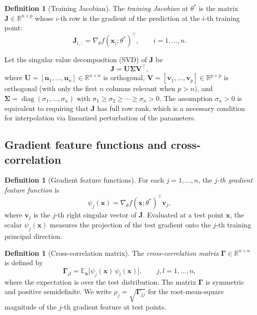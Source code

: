 \documentclass[12pt]{amsart}
\theoremstyle{definition}
\newtheorem{definition}[theorem]{Definition}
\theoremstyle{remark}
\DeclareMathOperator{\diag}{diag}
\newcommand{\R}{\mathbb{R}}
\newcommand{\E}{\mathbb{E}}
\newcommand{\bx}{\mathbf{x}}
\newcommand{\bJ}{\mathbf{J}}
\newcommand{\bU}{\mathbf{U}}
\newcommand{\bV}{\mathbf{V}}
\newcommand{\bu}{\mathbf{u}}
\newcommand{\bv}{\mathbf{v}}
\begin{document}
\begin{definition}[Training Jacobian]\label{def:jacobian}
The \emph{training Jacobian} at $\theta^{*}$ is the matrix
$\bJ \in \R^{n \times p}$ whose $i$-th row is the gradient of the prediction at
the $i$-th training point:
\begin{equation}\label{eq:jacobian}
  \bJ_{i,:} = \nabla_{\theta} f(\bx_{i}; \theta^{*})^{\top}, \qquad
  i = 1, \ldots, n.
\end{equation}
\end{definition}

Let the singular value decomposition (SVD) of $\bJ$ be
\begin{equation}\label{eq:svd}
  \bJ = \bU \boldsymbol{\Sigma} \bV^{\top},
\end{equation}
where $\bU = [\bu_{1}, \ldots, \bu_{n}] \in \R^{n \times n}$ is orthogonal,
$\bV = [\bv_{1}, \ldots, \bv_{p}] \in \R^{p \times p}$ is orthogonal (with
only the first $n$ columns relevant when $p > n$), and
$\boldsymbol{\Sigma} = \diag(\sigma_{1}, \ldots, \sigma_{n})$ with
$\sigma_{1} \geq \sigma_{2} \geq \cdots \geq \sigma_{n} > 0$.  The assumption
$\sigma_{n} > 0$ is equivalent to requiring that $\bJ$ has full row rank, which
is a necessary condition for interpolation via linearized perturbation of the
parameters.

\subsection{Gradient feature functions and cross-correlation}

\begin{definition}[Gradient feature functions]\label{def:psi}
For each $j = 1, \ldots, n$, the \emph{$j$-th gradient feature function} is
\begin{equation}\label{eq:psi}
  \psi_{j}(\bx) = \nabla_{\theta} f(\bx; \theta^{*})^{\top} \bv_{j},
\end{equation}
where $\bv_{j}$ is the $j$-th right singular vector of $\bJ$.  Evaluated at a
test point $\bx$, the scalar $\psi_{j}(\bx)$ measures the projection of the
test gradient onto the $j$-th training principal direction.
\end{definition}

\begin{definition}[Cross-correlation matrix]\label{def:Gamma}
The \emph{cross-correlation matrix} $\boldsymbol{\Gamma} \in \R^{n \times n}$ is
defined by
\begin{equation}\label{eq:Gamma}
  \boldsymbol{\Gamma}_{jl}
  = \E_{\bx}\bigl[\psi_{j}(\bx)\,\psi_{l}(\bx)\bigr],
  \qquad j, l = 1, \ldots, n,
\end{equation}
where the expectation is over the test distribution.  The matrix
$\boldsymbol{\Gamma}$ is symmetric and positive semidefinite.  We write
$\rho_{j} = \sqrt{\boldsymbol{\Gamma}_{jj}}$ for the root-mean-square magnitude
of the $j$-th gradient feature at test points.
\end{definition}
\end{document}

